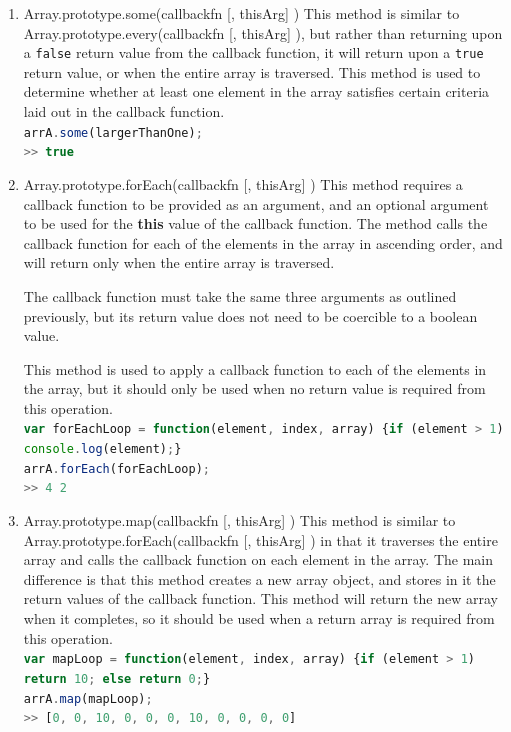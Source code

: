 \documentclass[a4paper,11pt,twoside]{report}
\def\jsinline{\lstinline[language=JavaScript, basicstyle=\small]}%\end{lstlisting}
\begin{document}
\begin{enumerate}
This method is used to determine whether every single element in an array satisfies certain criteria laid out in the callback function.\\
\jsinline|var largerThanOne = function(element, index, array) {return element > 1;}|\\
\jsinline|arrA.every(largerThanOne);|\\
\jsinline|>> false|

\item Array.prototype.some(callbackfn [, thisArg] ) \newline
This method is similar to Array.prototype.every(callbackfn [, thisArg] ), but rather than returning upon a \texttt{false} return value from the callback function, it will return upon a \texttt{true} return value, or when the entire array is traversed. This method is used to determine whether at least one element in the array satisfies certain criteria laid out in the callback function.\\
\jsinline|arrA.some(largerThanOne);|\\
\jsinline|>> true|

\item Array.prototype.forEach(callbackfn [, thisArg] ) \newline
This method requires a callback function to be provided as an argument, and an optional argument to be used for the \textbf{this} value of the callback function. The method calls the callback function for each of the elements in the array in ascending order, and will return only when the entire array is traversed.

The callback function must take the same three arguments as outlined previously, but its return value does not need to be coercible to a boolean value.

This method is used to apply a callback function to each of the elements in the array, but it should only be used when no return value is required from this operation.\\
\jsinline|var forEachLoop = function(element, index, array) {if (element > 1) console.log(element);}|\\
\jsinline|arrA.forEach(forEachLoop);|\\
\jsinline|>> 4 2|

\item Array.prototype.map(callbackfn [, thisArg] ) \newline
This method is similar to Array.prototype.forEach(callbackfn [, thisArg] ) in that it traverses the entire array and calls the callback function on each element in the array. The main difference is that this method creates a new array object, and stores in it the return values of the callback function. This method will return the new array when it completes, so it should be used when a return array is required from this operation.\\
\jsinline|var mapLoop = function(element, index, array) {if (element > 1) return 10; else return 0;}|\\
\jsinline|arrA.map(mapLoop);|\\
\jsinline|>> [0, 0, 10, 0, 0, 0, 10, 0, 0, 0, 0]|


\end{enumerate}
\end{document}
